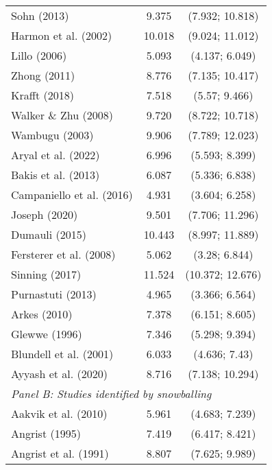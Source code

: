 \begin{singlespace}
\begin{footnotesize}
\begin{longtable}{
@{\hskip\tabcolsep}
l
*{2}{c}
@{}}
                             Sohn (2013) &  9.375 &  (7.932; 10.818) \\
                    Harmon et al. (2002) & 10.018 &  (9.024; 11.012) \\
                            Lillo (2006) &  5.093 &   (4.137; 6.049) \\
                            Zhong (2011) &  8.776 &  (7.135; 10.417) \\
                           Krafft (2018) &  7.518 &    (5.57; 9.466) \\
                    Walker \& Zhu (2008) &  9.720 &  (8.722; 10.718) \\
                          Wambugu (2003) &  9.906 &  (7.789; 12.023) \\
                     Aryal et al. (2022) &  6.996 &   (5.593; 8.399) \\
                     Bakis et al. (2013) &  6.087 &   (5.336; 6.838) \\
               Campaniello et al. (2016) &  4.931 &   (3.604; 6.258) \\
                           Joseph (2020) &  9.501 &  (7.706; 11.296) \\
                          Dumauli (2015) & 10.443 &  (8.997; 11.889) \\
                 Fersterer et al. (2008) &  5.062 &    (3.28; 6.844) \\
                          Sinning (2017) & 11.524 & (10.372; 12.676) \\
                       Purnastuti (2013) &  4.965 &   (3.366; 6.564) \\
                            Arkes (2010) &  7.378 &   (6.151; 8.605) \\
                           Glewwe (1996) &  7.346 &   (5.298; 9.394) \\
                  Blundell et al. (2001) &  6.033 &    (4.636; 7.43) \\
                    Ayyash et al. (2020) &  8.716 &  (7.138; 10.294) \\ 
                     \midrule
\multicolumn{3}{l}{\textit{Panel B: Studies identified by snowballing}}\\
                    Aakvik et al. (2010) &  5.961 &   (4.683; 7.239) \\
                          Angrist (1995) &  7.419 &   (6.417; 8.421) \\
                   Angrist et al. (1991) &  8.807 &   (7.625; 9.989) \\

\end{longtable}
\end{footnotesize}
\end{singlespace}
